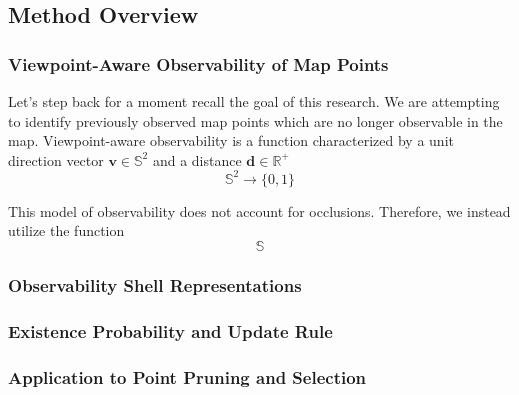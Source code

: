 \subsection{Method Overview}

\subsubsection{Viewpoint-Aware Observability of Map Points}


Let's step back for a moment recall the goal of this research. We are attempting to identify previously observed map points which are no longer observable in the map. Viewpoint-aware observability is a function characterized by a unit direction vector $\mathbf{v}\in\mathbb{S}^2$ and a distance $\mathbf{d}\in\mathbb{R}^+$
$$
    \mathbb{S}^2\rightarrow\{0,1\}
$$


This model of observability does not account for occlusions. Therefore, we instead utilize the function
$$
    \mathbb{S}
$$



\subsubsection{Observability Shell Representations}

\subsubsection{Existence Probability and Update Rule}

\subsubsection{Application to Point Pruning and Selection}
